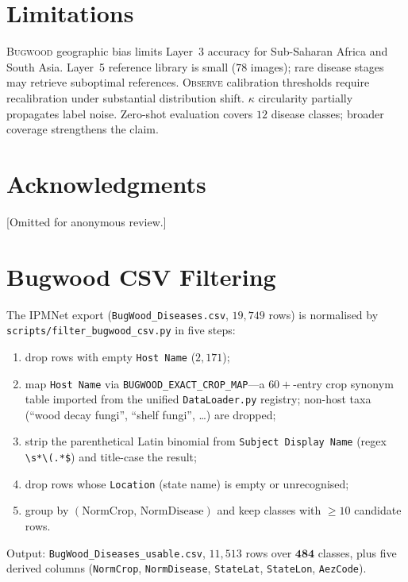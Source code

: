 \documentclass[11pt,twocolumn]{article}
\newcommand{\observe}{\textsc{Observe}\xspace}
\newcommand{\bugwood}{\textsc{Bugwood}\xspace}
\begin{document}
\section*{Limitations}

\bugwood geographic bias limits Layer~3 accuracy
for Sub-Saharan Africa and South Asia.
Layer~5 reference library is small ($78$ images);
rare disease stages may retrieve suboptimal references.
\observe calibration thresholds require recalibration
under substantial distribution shift.
$\kappa$ circularity partially propagates label noise.
Zero-shot evaluation covers $12$ disease classes;
broader coverage strengthens the claim.

\section*{Acknowledgments}
[Omitted for anonymous review.]




\appendix

\section{Bugwood CSV Filtering}
\label{app:selection}

The IPMNet export
(\texttt{BugWood\_Diseases.csv}, $19{,}749$ rows)
is normalised by
\texttt{scripts/filter\_bugwood\_csv.py} in
five steps:
\begin{enumerate}
  \item drop rows with empty \texttt{Host Name}
    ($2{,}171$);
  \item map \texttt{Host Name} via
    \texttt{BUGWOOD\_EXACT\_CROP\_MAP}---a
    $60{+}$-entry crop synonym table imported
    from the unified \texttt{DataLoader.py}
    registry; non-host taxa (``wood decay
    fungi'', ``shelf fungi'', \ldots) are
    dropped;
  \item strip the parenthetical Latin binomial
    from \texttt{Subject Display Name} (regex
    \texttt{\textbackslash{}s*\textbackslash{}(.*\$})
    and title-case the result;
  \item drop rows whose \texttt{Location}
    (state name) is empty or unrecognised;
  \item group by
    $(\text{NormCrop},\,\text{NormDisease})$
    and keep classes with $\geq{10}$ candidate
    rows.
\end{enumerate}
Output: \texttt{BugWood\_Diseases\_usable.csv},
$11{,}513$ rows over $\mathbf{484}$ classes,
plus five derived columns (\texttt{NormCrop},
\texttt{NormDisease}, \texttt{StateLat},
\texttt{StateLon}, \texttt{AezCode}).
\end{document}
